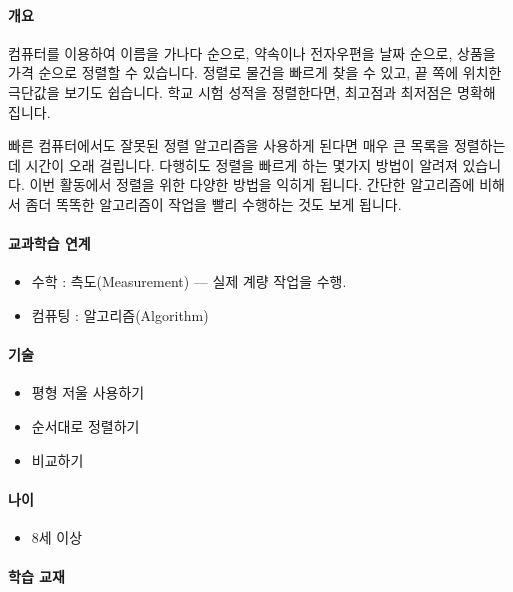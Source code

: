 \documentclass[]{article}
\begin{document}
\mbox{}\paragraph{개요}\label{section-102}

컴퓨터를 이용하여 이름을 가나다 순으로, 약속이나 전자우편을 날짜 순으로,
상품을 가격 순으로 정렬할 수 있습니다. 정렬로 물건을 빠르게 찾을 수
있고, 끝 쪽에 위치한 극단값을 보기도 쉽습니다. 학교 시험 성적을
정렬한다면, 최고점과 최저점은 명확해 집니다.

빠른 컴퓨터에서도 잘못된 정렬 알고리즘을 사용하게 된다면 매우 큰 목록을
정렬하는데 시간이 오래 걸립니다. 다행히도 정렬을 빠르게 하는 몇가지
방법이 알려져 있습니다. 이번 활동에서 정렬을 위한 다양한 방법을 익히게
됩니다. 간단한 알고리즘에 비해서 좀더 똑똑한 알고리즘이 작업을 빨리
수행하는 것도 보게 됩니다.

\mbox{}\paragraph{교과학습 연계}\label{section-103}

\begin{itemize}
\itemsep1pt\parskip0pt
\item
  수학 : 측도(Measurement) --- 실제 계량 작업을 수행.
\item
  컴퓨팅 : 알고리즘(Algorithm)
\end{itemize}

\mbox{}\paragraph{기술}\label{section-104}

\begin{itemize}
\itemsep1pt\parskip0pt
\item
  평형 저울 사용하기
\item
  순서대로 정렬하기
\item
  비교하기
\end{itemize}

\mbox{}\paragraph{나이}\label{section-105}

\begin{itemize}
\itemsep1pt\parskip0pt
\item
  8세 이상
\end{itemize}

\mbox{}\paragraph{학습 교재}\label{section-106}
\end{document}
